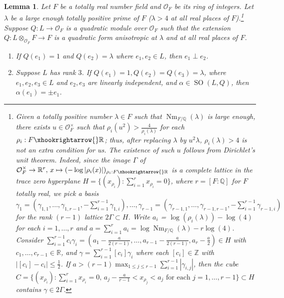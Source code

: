 \documentclass{amsart}
\numberwithin{equation}{subsection}
\numberwithin{theorem}{section}
\newtheorem{lemma}[theorem]{Lemma}
\theoremstyle{definition}
\theoremstyle{remark}
\newcommand{\bQ}{\mathbb{Q}}
\newcommand{\bR}{\mathbb{R}}
\newcommand{\bZ}{\mathbb{Z}}
\DeclareMathOperator{\SO}{SO}
\DeclareMathOperator{\Nm}{Nm}
\begin{document}
\begin{lemma} \label{lem:quad_global}
        Let $F$ be a totally real number field and $\mathcal{O}_F$ be its ring of integers. Let $\lambda$ be a large enough totally positive prime of $F$ ($\lambda > 4$ at all real places of $F$).\footnote{Given a totally positive number $\lambda\in F$ such that $\Nm_{F/\bQ}(\lambda)$ is large enough, there exists $u \in \mathcal{O}_F^\times$ such that $\rho_i(u^2) > \frac{4}{\rho_i(\lambda)}$ for each $\rho_i: F\xhookrightarrow{}\bR$; thus, after replacing $\lambda$ by $u^2\lambda$, $\rho_i(\lambda)>4$  is not an extra condition for us. The existence of such $u$ follows from Dirichlet's unit theorem. Indeed, since the image $\Gamma$ of $\mathcal{O}_F^\times \to \mathbb{R}^{r}, \,x\mapsto (-\log|\rho_i(x)|)_{\rho_i:F\xhookrightarrow{}\bR}$ is a complete lattice in the trace zero hyperplane $H =\{(x_{\rho_i}): \sum_{i=1}^r x_{\rho_i} = 0\}$, where $r=[F:\bQ]$ for $F$ totally real, we pick a basis $\gamma_1 = (\gamma_{1,1}, \dotsc, \gamma_{1, r-1}, -\sum_{i=1}^{r-1}\gamma_{1,i}), \dotsc, \gamma_{r-1} = (\gamma_{r-1,1}, \dotsc, \gamma_{r-1, r-1}, -\sum_{i=1}^{r-1}\gamma_{r-1,i})$ for the rank $(r-1)$ lattice $2\Gamma \subset H$. Write $a_i$ = $\log(\rho_i(\lambda))-\log(4)$ for each $i=1, \dotsc, r$ and $a=\sum_{i=1}^r a_i = \log \Nm_{F/\bQ}(\lambda) - r\log(4)$. Consider $\sum_{i=1}^{r-1}c_i\gamma_i = (a_1 -\frac{a}{2(r-1)}, \dotsc, a_{r-1} -\frac{a}{2(r-1)}, a_r -\frac{a}{2}) \in H$ with $c_1, \dotsc, c_{r-1} \in \bR$, and $\gamma = \sum_{i=1}^{r-1}[c_i]\gamma_i$ where each $[c_i]\in \bZ$ with $|[c_i] - c_i|\leq \frac{1}{2}$. 
        If $a > (r-1) \max_{1\leq j \leq r-1} \sum_{i=1}^{r-1}|\gamma_{i,j}|$, then the cube $C = \{(x_{\rho_i}): \sum_{i=1}^r x_{\rho_i} = 0, \, a_j -\frac{a}{r-1} < x_{\rho_j} < a_j\text{ for each }j=1, \dotsc, r-1\}\subset H$ contains $\gamma\in 2\Gamma$.} Suppose $Q: L \to \mathcal{O}_F$ is a quadratic module over $\mathcal{O}_F$ such that the extension $Q: L \otimes_{\mathcal{O}_F} F \to F$ is a quadratic form anisotropic at $\lambda$ and at all real places of $F$. 
        \begin{enumerate}
            \item If $Q(e_1) = 1$ and $ Q(e_2) = \lambda$ where $e_1, e_2\in L$, then $e_1\perp e_2$.
            \item Suppose $L$ has rank $3$. If $Q(e_1) = 1, Q(e_2) =Q(e_3) =\lambda$, where $e_1, e_2, e_3\in L$ and $e_2, e_3$ are linearly independent, and $\alpha\in \SO(L, Q)$, then $\alpha(e_1)  = \pm e_1$. 
        \end{enumerate}
\end{lemma}
\end{document}
